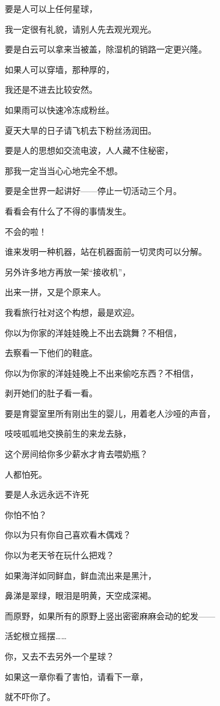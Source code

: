 \par 
\par 要是人可以上任何星球，
\par 我一定很有礼貌，请别人先去观光观光。
\par 
\par 要是白云可以拿来当被盖，除湿机的销路一定更兴隆。
\par 
\par 如果人可以穿墙，那种厚的，
\par 我还是不进去比较安然。
\par 
\par 如果雨可以快速冷冻成粉丝。
\par 夏天大旱的日子请飞机去下粉丝汤润田。
\par 
\par 要是人的思想如交流电波，人人藏不住秘密，
\par 那我一定当当心心地完全不想。
\par 
\par 要是全世界一起讲好——停止一切活动三个月。
\par 看看会有什么了不得的事情发生。
\par 不会的啦！
\par 
\par 谁来发明一种机器，站在机器面前一切灵肉可以分解。
\par 另外许多地方再放一架“接收机”，
\par 出来一拼，又是个原来人。
\par 我看旅行社对这个构想，最是欢迎。
\par 
\par 你以为你家的洋娃娃晚上不出去跳舞？不相信，
\par 去察看一下他们的鞋底。
\par 你以为你家的洋娃娃晚上不出来偷吃东西？不相信，
\par 剥开她们的肚子看一看。
\par 
\par 要是育婴室里所有刚出生的婴儿，用着老人沙哑的声音，
\par 吱吱呱呱地交换前生的来龙去脉，
\par 这个房间给你多少薪水才肯去喂奶瓶？
\par 
\par 人都怕死。
\par 要是人永远永远不许死
\par 你怕不怕？
\par 
\par 你以为只有你自己喜欢看木偶戏？
\par 你以为老天爷在玩什么把戏？
\par 
\par 如果海洋如同鲜血，鲜血流出来是黑汁，
\par 鼻涕是翠绿，眼泪是明黄，天空成深褐。
\par 而原野，如果所有的原野上竖出密密麻麻会动的蛇发——
\par 活蛇根立摇摆……
\par 你，又去不去另外一个星球？
\par 
\par 如果这一章你看了害怕，请看下一章，
\par 就不吓你了。



